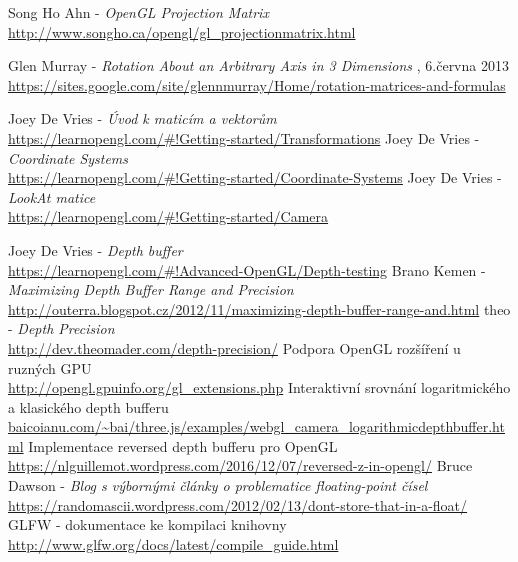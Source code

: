  \begin{thebibliography}{1}
		  Song Ho Ahn - { \em OpenGL Projection Matrix}\\ \url{http://www.songho.ca/opengl/gl_projectionmatrix.html}
		
		  Glen Murray - {\em Rotation About an Arbitrary Axis in 3 Dimensions} , 6.června 2013\\
		\url{https://sites.google.com/site/glennmurray/Home/rotation-matrices-and-formulas}
		
		 Joey De Vries - {\em Úvod k maticím a vektorům}\\
		\url{https://learnopengl.com/#!Getting-started/Transformations}
		 Joey De Vries - {\em Coordinate Systems}\\
		\url{https://learnopengl.com/#!Getting-started/Coordinate-Systems}
		 Joey De Vries - {\em LookAt matice}\\
		\url{https://learnopengl.com/#!Getting-started/Camera}
		
		 Joey De Vries - {\em Depth buffer}\\
		\url{https://learnopengl.com/#!Advanced-OpenGL/Depth-testing}
		  Brano Kemen - {\em Maximizing Depth Buffer Range and Precision}\\
		\url{http://outerra.blogspot.cz/2012/11/maximizing-depth-buffer-range-and.html}
		 theo -  { \em Depth Precision}\\
		\url{http://dev.theomader.com/depth-precision/}
		 Podpora OpenGL rozšíření u ruzných GPU\\
		\url{http://opengl.gpuinfo.org/gl\_extensions.php}
		 Interaktivní srovnání logaritmického a klasického depth bufferu\\
		\url{baicoianu.com/~bai/three.js/examples/webgl_camera_logarithmicdepthbuffer.html}
		 Implementace reversed depth bufferu pro OpenGL\\
		\url{https://nlguillemot.wordpress.com/2016/12/07/reversed-z-in-opengl/}
		 Bruce Dawson - { \em Blog s výbornými články o problematice floating-point čísel}\\
		\url{https://randomascii.wordpress.com/2012/02/13/dont-store-that-in-a-float/}
		 GLFW - dokumentace ke kompilaci knihovny\\
		\url{http://www.glfw.org/docs/latest/compile_guide.html}
	\end{thebibliography}
